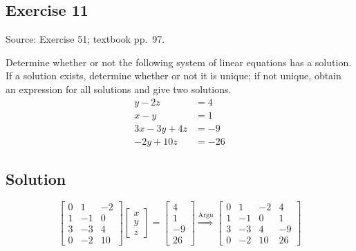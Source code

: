 \documentclass[12pt,a4paper]{article}
\newlength{\questionroom}
\newenvironment{questionprompt}{%
  \begin{lrbox}{\questionbox}\begin{minipage}{\linewidth}%
}{%
  \end{minipage}\end{lrbox}%
  \setlength{\questionroom}{\dimexpr\ht\questionbox+\dp\questionbox+5.2cm\relax}%
  \ifdim\questionroom>\textheight\setlength{\questionroom}{\textheight}\fi
  \Needspace{\questionroom}%
  \noindent\usebox{\questionbox}\par
}
\begin{document}
\begin{questionprompt}
\section*{Exercise 11}
\label{practice:11}
{\small Source: Exercise 51; textbook pp.~97.}\par
Determine whether or not the following system of linear equations has a solution. If a solution exists, determine whether or not it is unique; if not unique, obtain an expression for all solutions and give two solutions.
\begin{align*}y-2z&=4\\x-y&=1\\3x-3y+4z&=-9\\-2y+10z&=-26\end{align*}
\end{questionprompt}
\subsection*{Solution}

\[
\begin{bmatrix}
	0 & 1 & -2 \\
	1 & -1 & 0 \\
	3 & -3 & 4 \\
	0 & -2 & 10
\end{bmatrix}\begin{bmatrix}
x \\ y \\ z
\end{bmatrix} = \begin{bmatrix}
4 \\ 1 \\ -9 \\ 26
\end{bmatrix} \overset{\text{Argu}}{\Rightarrow} \begin{bmatrix}
	0 & 1 & -2 & 4\\
1 & -1 & 0 & 1\\
3 & -3 & 4 & -9\\
0 & -2 & 10 & 26
\end{bmatrix}
\]
\end{document}
